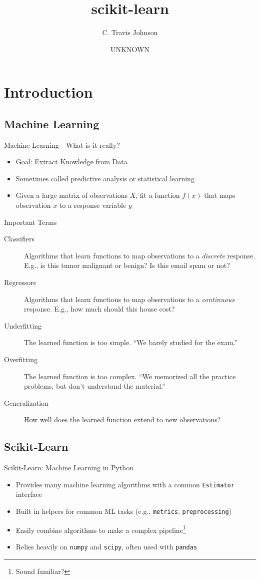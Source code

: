 \documentclass{lug}
\title{scikit-learn}
\author{C. Travis Johnson}
\date{UNKNOWN}
\institute{Mines Linux Users Group}
\begin{document}
\section{Introduction}
\subsection{Machine Learning}
\begin{frame}{Machine Learning - What is it really?}
    \begin{itemize}[<+->]
        \item Goal: Extract Knowledge from Data
        \item Sometimes called predictive analysis or statistical learning
        \item Given a large matrix of observations $X$, fit a function $f(x)$ that maps observation $x$ to a response variable $y$
    \end{itemize}
\end{frame}

\begin{frame}{Important Terms}
  \begin{description}
    \item[Classifiers] Algorithms that learn functions to map observations to a \textit{discrete} response. E.g., is this tumor malignant or benign? Is this
      email spam or not?
    \item[Regressors] Algorithms that learn functions to map observations to a \textit{continuous} response. E.g., how much should this house cost?
    \item[Underfitting] The learned function is too simple. ``We barely studied for the exam.''
    \item[Overfitting] The learned function is too complex. ``We memorized all the practice problems, but don't understand the material.''
    \item[Generalization] How well does the learned function extend to new observations?
  \end{description}
\end{frame}

\subsection{Scikit-Learn}
\begin{frame}{Scikit-Learn: Machine Learning in Python}
  \begin{itemize}[<+->]
    \item Provides many machine learning algorithms with a common \texttt{Estimator} interface
    \item Built in helpers for common ML tasks (e.g., \texttt{metrics}, \texttt{preprocessing})
    \item Easily combine algorithms to make a complex pipeline\footnote{Sound familiar?}
    \item Relies heavily on \texttt{numpy} and \texttt{scipy}, often used with \texttt{pandas}
  \end{itemize}
\end{frame}
\end{document}
